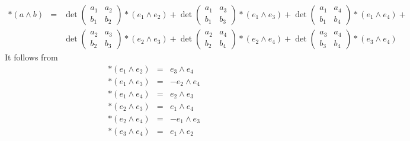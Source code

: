 \documentclass[color=black,11pt]{elegantpaper}
\begin{document}
\begin{eqnarray*}
\ast(a\wedge b) &= & \det\left( \begin{array}{cc}
                                       a_1 & a_2 \\
                                       b_1 & b_2
                                   \end{array}\right) \ast (e_1\wedge e_2) +
             \det\left( \begin{array}{cc}
                                       a_1 & a_3 \\
                                       b_1 & b_3
                                   \end{array}\right) \ast(e_1 \wedge e_3) +
             \det\left( \begin{array}{cc}
                                       a_1 & a_4 \\
                                       b_1 & b_4
                                   \end{array}\right) \ast (e_1 \wedge e_4) +\\
 & & \det\left( \begin{array}{cc}
                                       a_2 & a_3 \\
                                       b_2 & b_3
                                   \end{array}\right) \ast(e_2\wedge e_3) +
             \det\left( \begin{array}{cc}
                                       a_2 & a_4 \\
                                       b_2 & b_4
                                   \end{array}\right) \ast(e_2 \wedge e_4) +
             \det\left( \begin{array}{cc}
                                       a_3 & a_4 \\
                                       b_3 & b_4
                                   \end{array}\right) \ast(e_3 \wedge e_4 )
\end{eqnarray*}
It follows from 
\begin{eqnarray*}
\ast (e_1\wedge e_2) &=& e_3 \wedge e_4\\
\ast (e_1\wedge e_3) &=& -e_2 \wedge e_4\\
\ast (e_1\wedge e_4) &=& e_2 \wedge e_3\\
\ast (e_2\wedge e_3) &=& e_1 \wedge e_4\\
\ast (e_2\wedge e_4) &=& -e_1 \wedge e_3\\
\ast (e_3\wedge e_4) &=& e_1 \wedge e_2\\
\end{eqnarray*}
\end{document}
